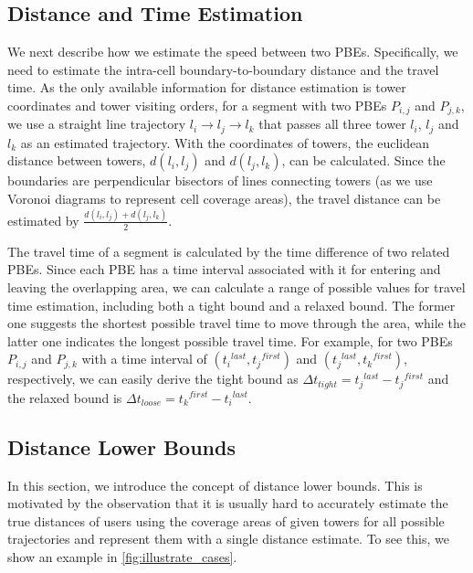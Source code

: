 \subsection{Distance and Time Estimation}

We next describe how we estimate the speed between two PBEs. Specifically, we need to estimate the intra-cell boundary-to-boundary distance and the travel time. As the only available information for distance estimation is tower coordinates and tower visiting orders, for a segment with two PBEs $P_{i,j}$ and $P_{j,k}$, we use a straight line trajectory $l_i \rightarrow l_j \rightarrow l_k$ that passes all three tower $l_i$, $l_j$ and $l_k$ as an estimated trajectory. With the coordinates of towers, the euclidean distance between towers, $d(l_i,l_j)$ and $d(l_j,l_k)$, can be calculated. Since the boundaries are perpendicular bisectors of lines connecting towers (as we use Voronoi diagrams to represent cell coverage areas), the travel distance can be estimated by $\frac{d(l_i,l_j) + d(l_j,l_k)}{2}$. 

The travel time of a segment is calculated by the time difference of two related PBEs. Since each PBE has a time interval associated with it for entering and leaving the overlapping area, we can calculate a range of possible values for travel time estimation, including both a tight bound and a relaxed bound. The former one suggests the shortest possible travel time to move through the area, while the latter one indicates the longest possible travel time. For example, for two PBEs $P_{i,j}$ and $P_{j,k}$ with a time interval of $({t_i}^{last}, {t_j}^{first})$ and $({t_j}^{last}, {t_k}^{first})$, respectively, we can easily derive the tight bound as $\Delta t_{tight} = {t_j}^{last} - {t_j}^{first}$ and the relaxed bound is $\Delta t_{loose} = {t_k}^{first} - {t_i}^{last}$.

\subsection{Distance Lower Bounds}

In this section, we introduce the concept of distance lower bounds. This is motivated by the observation that it is usually hard to accurately estimate the true distances of users using the coverage areas of given towers for all possible trajectories and represent them with a single distance estimate. To see this, we show an example in \autoref{fig:illustrate_cases}.

